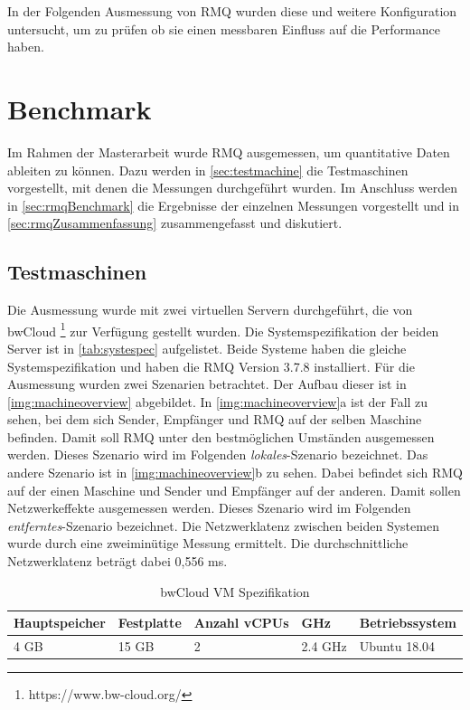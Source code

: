In der Folgenden Ausmessung von RMQ wurden diese und weitere Konfiguration untersucht, um zu prüfen ob sie einen messbaren Einfluss auf die Performance haben.

\section{Benchmark}
Im Rahmen der Masterarbeit wurde RMQ ausgemessen, um quantitative Daten ableiten zu können. Dazu werden in \autoref{sec:testmachine} die Testmaschinen vorgestellt, mit denen die Messungen durchgeführt wurden. Im Anschluss werden in \autoref{sec:rmqBenchmark} die Ergebnisse der einzelnen Messungen vorgestellt und in \autoref{sec:rmqZusammenfassung} zusammengefasst und diskutiert.

\subsection{Testmaschinen}
\label{sec:testmachine}
Die Ausmessung wurde mit zwei virtuellen Servern durchgeführt, die von bwCloud \footnote{https://www.bw-cloud.org/} zur Verfügung gestellt wurden. Die Systemspezifikation der beiden Server ist in \autoref{tab:systespec} aufgelistet. Beide Systeme haben die gleiche Systemspezifikation und haben die RMQ Version 3.7.8 installiert. Für die Ausmessung wurden zwei Szenarien betrachtet. Der Aufbau dieser ist in \autoref{img:machineoverview} abgebildet. In \autoref{img:machineoverview}a ist der Fall zu sehen, bei dem sich Sender, Empfänger und RMQ auf der selben Maschine befinden. Damit soll RMQ unter den bestmöglichen Umständen ausgemessen werden. Dieses Szenario wird im Folgenden \textit{lokales}-Szenario bezeichnet. Das andere Szenario ist in \autoref{img:machineoverview}b zu sehen. Dabei befindet sich RMQ auf der einen Maschine und Sender und Empfänger auf der anderen. Damit sollen Netzwerkeffekte ausgemessen werden. Dieses Szenario wird im Folgenden \textit{entferntes}-Szenario bezeichnet. Die Netzwerklatenz zwischen beiden Systemen wurde durch eine zweiminütige Messung ermittelt. Die durchschnittliche Netzwerklatenz beträgt dabei 0,556 ms. 

\begin{table}
  \centering
  \begin{tabular}{|l|l|l|l|l|}
    Hauptspeicher & Festplatte & Anzahl vCPUs & GHz & Betriebssystem \\
    \hline
     4 GB & 15 GB & 2 & 2.4 GHz & Ubuntu 18.04
  \end{tabular}
	\caption{\label{tab:systespec} bwCloud VM Spezifikation}
\end{table}

